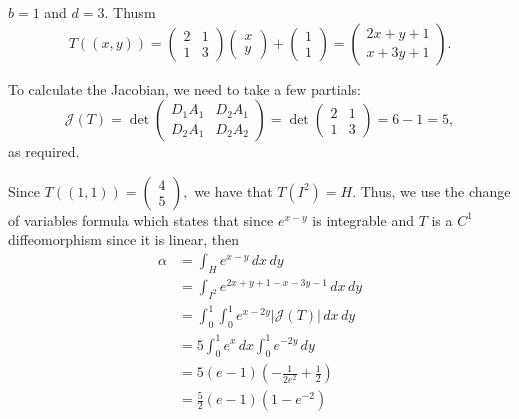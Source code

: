 \documentclass[11pt]{article}
\begin{document}
\begin{solution}
    $b = 1$ and $d = 3.$ Thusm 
    \[T((x,y)) = \begin{pmatrix}
        2 & 1\\
        1 & 3
    \end{pmatrix}\begin{pmatrix}
        x\\y
    \end{pmatrix} + \begin{pmatrix}
        1\\1
    \end{pmatrix}= \begin{pmatrix}
        2x + y + 1\\
        x + 3y + 1
    \end{pmatrix}.\]

    To calculate the Jacobian, we need to take a few partials: 
    \[\mathcal{J}(T) = \det \begin{pmatrix}
        D_1 A_1 & D_2 A_1\\
        D_2 A_1 & D_2 A_2
    \end{pmatrix}  =\det \begin{pmatrix}
        2 & 1\\
        1 & 3
    \end{pmatrix} = 6 - 1 = 5,\] as required.

    Since $T((1,1)) = \begin{pmatrix}
        4\\ 5
    \end{pmatrix},$ we have that $T(I^2) = H.$ Thus, we use the change of variables formula which states that since $e^{x-y}$ is integrable and $T$ is a $C^1$ diffeomorphism since it is linear,  then 
    \begin{align*}
        \alpha &= \int_H e^{x-y}\,dx\,dy\\
        &= \int_{I^2}e^{2x + y + 1 - x- 3y - 1}\,dx\,dy\\
        &= \int_0^1\int_0^1 e^{x - 2y}|\mathcal{J}(T)|\,dx\,dy\\
        &= 5\int_0^1e^x\, dx \int_0^1 e^{-2y}\,dy\\
        &= 5(e-1)(-\frac{1}{2e^2} + \frac{1}{2})\\
        &= \frac{5}{2}(e-1)(1 - e^{-2})
    \end{align*}
\end{solution}

\newpage
\end{document}
